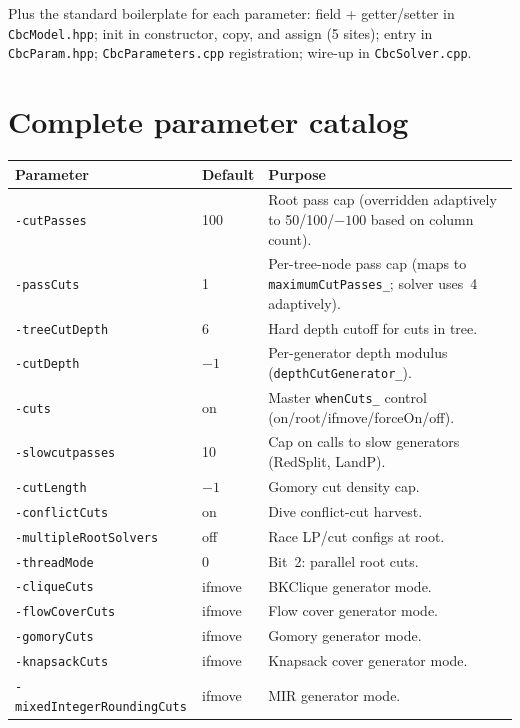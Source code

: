 \documentclass[11pt,a4paper]{article}
\begin{document}
Plus the standard boilerplate for each parameter: field +
getter/setter in \texttt{CbcModel.hpp}; init in constructor, copy,
and assign (5 sites); entry in \texttt{CbcParam.hpp};
\texttt{CbcParameters.cpp} registration; wire-up in
\texttt{CbcSolver.cpp}.

\section{Complete parameter catalog}
\label{sec:catalog}

\begin{longtable}{p{4.0cm}p{2.0cm}p{8.5cm}}
\toprule
\textbf{Parameter} & \textbf{Default} & \textbf{Purpose}\\
\midrule
\endhead
\texttt{-cutPasses}          & 100       & Root pass cap (overridden adaptively
  to 50/100/$-100$ based on column count).\\
\texttt{-passCuts}           & 1         & Per-tree-node pass cap (maps to
  \texttt{maximumCutPasses\_}; solver uses~4 adaptively).\\
\texttt{-treeCutDepth}       & 6         & Hard depth cutoff for cuts in tree.\\
\texttt{-cutDepth}           & $-1$      & Per-generator depth modulus
  (\texttt{depthCutGenerator\_}).\\
\texttt{-cuts}               & on        & Master \texttt{whenCuts\_} control
  (on/root/ifmove/forceOn/off).\\
\texttt{-slowcutpasses}      & 10        & Cap on calls to slow generators
  (RedSplit, LandP).\\
\texttt{-cutLength}          & $-1$      & Gomory cut density cap.\\
\texttt{-conflictCuts}       & on        & Dive conflict-cut harvest.\\
\texttt{-multipleRootSolvers}& off       & Race LP/cut configs at root.\\
\texttt{-threadMode}         & 0         & Bit~2: parallel root cuts.\\
\texttt{-cliqueCuts}         & ifmove    & BKClique generator mode.\\
\texttt{-flowCoverCuts}      & ifmove    & Flow cover generator mode.\\
\texttt{-gomoryCuts}         & ifmove    & Gomory generator mode.\\
\texttt{-knapsackCuts}       & ifmove    & Knapsack cover generator mode.\\
\texttt{-mixedIntegerRoundingCuts} & ifmove & MIR generator mode.\\

\end{longtable}
\end{document}
